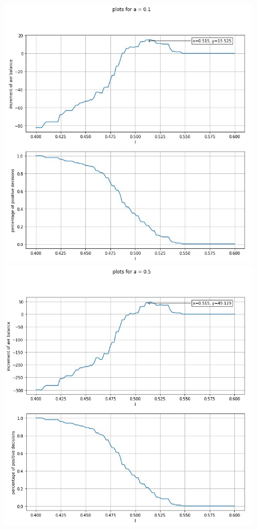 \documentclass{article}
\begin{document}
	\begin{figure}[H]
		\begin{minipage}[h]{0.49\linewidth}
			\includegraphics[width=1.0\linewidth]{assets/plot_a01.jpg}
		\end{minipage}
		\hfill
		\begin{minipage}[h]{0.49\linewidth}
			\includegraphics[width=1.0\linewidth]{assets/plot_a05.jpg}

\end{minipage}
\end{figure}
\end{document}
